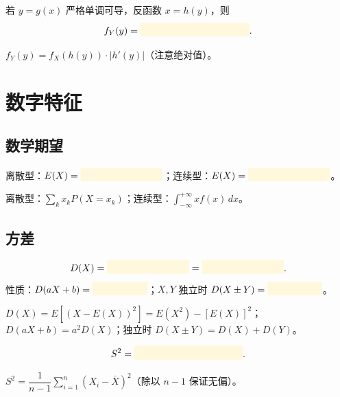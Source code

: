 \documentclass[11pt,a4paper]{article}
\newcommand{\blankbox}[1]{%
  \textcolor{blankyellow}{\rule[-0.1cm]{#1}{0.5cm}}%
}
\begin{document}
\begin{formulabox}
若 $y=g(x)$ 严格单调可导，反函数 $x=h(y)$，则
\[f_Y(y) = \blankbox{4cm}.\]
\end{formulabox}

\begin{answerbox}
$f_Y(y)=f_X(h(y))\cdot |h'(y)|$（注意绝对值）。
\end{answerbox}

\section{数字特征}

\subsection{数学期望}

\begin{formulabox}[数学期望]
离散型：$E(X)=\blankbox{3cm}$；连续型：$E(X)=\blankbox{3cm}$。
\end{formulabox}

\begin{answerbox}
离散型：$\displaystyle\sum_k x_k P(X=x_k)$；连续型：$\displaystyle\int_{-\infty}^{+\infty} x f(x)\,dx$。
\end{answerbox}

\subsection{方差}

\begin{formulabox}[方差]
\[D(X) = \blankbox{3cm} = \blankbox{3cm}.\]
性质：$D(aX+b)=\blankbox{2cm}$；$X,Y$ 独立时 $D(X\pm Y)=\blankbox{2cm}$。
\end{formulabox}

\begin{answerbox}
$D(X)=E[(X-E(X))^2]=E(X^2)-[E(X)]^2$；$D(aX+b)=a^2 D(X)$；独立时 $D(X\pm Y)=D(X)+D(Y)$。
\end{answerbox}

\begin{formulabox}[样本方差]
\[S^2 = \blankbox{4cm}.\]
\end{formulabox}

\begin{answerbox}
$S^2=\dfrac{1}{n-1}\displaystyle\sum_{i=1}^n (X_i-\bar X)^2$（除以 $n-1$ 保证无偏）。
\end{answerbox}
\end{document}

